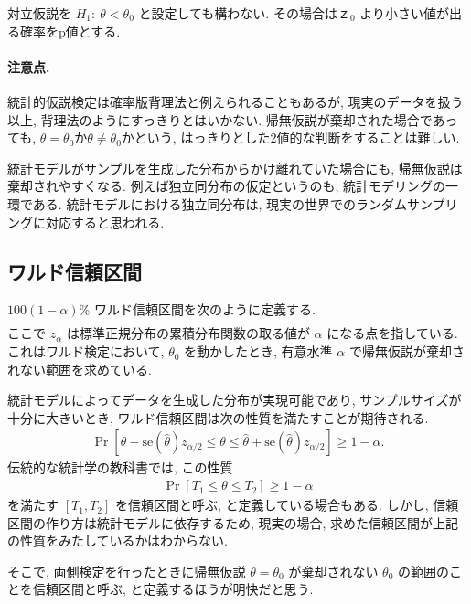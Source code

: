 \documentclass[a4paper, 12pt]{jarticle}
\begin{document}
対立仮説を $H_1:~\theta < \theta_0$ と設定しても構わない. その場合は$ｚ_0$ より小さい値が出る確率をp値とする.

\paragraph{注意点.} 
統計的仮説検定は確率版背理法と例えられることもあるが, 現実のデータを扱う以上, 背理法のようにすっきりとはいかない. 
帰無仮説が棄却された場合であっても, $\theta = \theta_0$か$\theta \neq \theta_0$かという, はっきりとした2値的な判断をすることは難しい. 

統計モデルがサンプルを生成した分布からかけ離れていた場合にも, 帰無仮説は棄却されやすくなる. 
例えば独立同分布の仮定というのも, 統計モデリングの一環である. 
統計モデルにおける独立同分布は, 現実の世界でのランダムサンプリングに対応すると思われる. 

\subsection{ワルド信頼区間}
$100(1-\alpha)$\% ワルド信頼区間を次のように定義する.
\begin{align}
[\hat \theta - \mathrm{se}(\hat \theta)z_{\alpha/2}, \hat \theta +  \mathrm{se}(\hat \theta)z_{\alpha/2}]
\label{Waldstat}
\end{align}
ここで $z_{\alpha}$ は標準正規分布の累積分布関数の取る値が $\alpha$ になる点を指している.
これはワルド検定において, $\theta_0$ を動かしたとき, 有意水準 $\alpha$ で帰無仮説が棄却されない範囲を求めている. 

統計モデルによってデータを生成した分布が実現可能であり, サンプルサイズが十分に大きいとき, ワルド信頼区間は次の性質を満たすことが期待される. 
\begin{align}
\Pr[\hat \theta - \mathrm{se}(\hat \theta)z_{\alpha/2} \le \theta \le \hat \theta +  \mathrm{se}(\hat \theta)z_{\alpha/2}] \ge 1-\alpha.
\end{align}
伝統的な統計学の教科書では, この性質 
\begin{align}
\Pr[T_1 \le \theta\le T_2] \ge 1-\alpha
\label{CI}
\end{align}
を満たす $[T_1, T_2]$ を信頼区間と呼ぶ, と定義している場合もある. 
しかし, 信頼区間の作り方は統計モデルに依存するため, 現実の場合, 求めた信頼区間が上記の性質をみたしているかはわからない. 

そこで, 両側検定を行ったときに帰無仮説 $\theta = \theta_0$ が棄却されない $\theta_0$ の範囲のことを信頼区間と呼ぶ, と定義するほうが明快だと思う.
\end{document}
